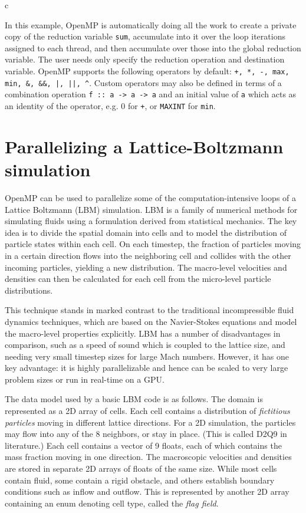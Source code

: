 \documentclass[conference, a4paper]{IEEEtran-modified}
\begin{document}
\begin{ccode}[]{c}

In this example, OpenMP is automatically doing all the work to create a private copy of the reduction variable \texttt{sum}, accumulate into it over the loop iterations assigned to each thread, and then accumulate over those into the global reduction variable. The user needs only specify the reduction operation and destination variable. OpenMP supports the following operators by default: \verb#+, *, -, max, min, &, &&, |, ||, ^#. Custom operators may also be defined in terms of a combination operation \texttt{f :: a -> a -> a} and an initial value of \texttt{a} which acts as an identity of the operator, e.g. 0 for \texttt{+}, or \texttt{MAXINT} for \texttt{min}.

\section{Parallelizing a Lattice-Boltzmann simulation}

OpenMP can be used to parallelize some of the computation-intensive loops of a Lattice Boltzmann (LBM) simulation. LBM is a family of numerical methods for simulating fluids using a formulation derived from statistical mechanics. The key idea is to divide the spatial domain into cells and to model the distribution of particle states within each cell. On each timestep, the fraction of particles moving in a certain direction flows into the neighboring cell and collides with the other incoming particles, yielding a new distribution. The macro-level velocities and densities can then be calculated for each cell from the micro-level particle distributions.

This technique stands in marked contrast to the traditional incompressible fluid dynamics techniques, which are based on the Navier-Stokes equations and model the macro-level properties explicitly. LBM has a number of disadvantages in comparison, such as a speed of sound which is coupled to the lattice size, and needing very small timestep sizes for large Mach numbers. However, it has one key advantage: it is highly parallelizable and hence can be scaled to very large problem sizes or run in real-time on a GPU.

The data model used by a basic LBM code is as follows. The domain is represented as a 2D array of cells. Each cell contains a distribution of \emph{fictitious particles} moving in different lattice directions. For a 2D simulation, the particles may flow into any of the 8 neighbors, or stay in place. (This is called D2Q9 in literature.) Each cell contains a vector of 9 floats, each of which contains the mass fraction moving in one direction. The macroscopic velocities and densities are stored in separate 2D arrays of floats of the same size. While most cells contain fluid, some contain a rigid obstacle, and others establish boundary conditions such as inflow and outflow. This is represented by another 2D array containing an enum denoting cell type, called the \emph{flag field}.


\end{ccode}
\end{document}
